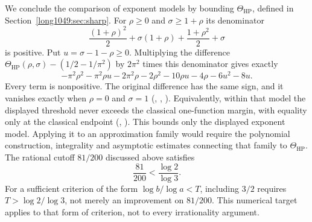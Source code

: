 We conclude the comparison of exponent models by bounding
$\Theta_{\mathrm{HP}}$, defined in Section~\ref{long1049:sec:sharp}.
For $\rho\ge0$ and $\sigma\ge1+\rho$ its denominator
\[
 \frac{(1+\rho)^2}{2}+\sigma(1+\rho)+\frac{1+\rho^2}{2}+\sigma
\]
is positive. Put $u=\sigma-1-\rho\ge0$. Multiplying the difference
$\Theta_{\mathrm{HP}}(\rho,\sigma)-(1/2-1/\pi^2)$ by
$2\pi^2$ times this denominator gives exactly
\[
 -\pi^2\rho^2-\pi^2\rho u-2\pi^2\rho-2\rho^2-10\rho u
 -4\rho-6u^2-8u.
\]
Every term is nonpositive. The original difference has the same sign, and
it vanishes exactly when $\rho=0$ and $\sigma=1$
(,
,
).
Equivalently, within that model the displayed threshold never exceeds the
classical one-function margin, with equality only at the classical endpoint
(,
).
This bounds only the displayed exponent model. Applying it to an
approximation family would require the polynomial construction,
integrality and asymptotic estimates connecting that family to
$\Theta_{\mathrm{HP}}$.
The rational cutoff $81/200$ discussed above satisfies
\[
 \frac{81}{200}<\frac{\log2}{\log3}.
\]
For a sufficient criterion of the form $\log b/\log a<T$, including
$3/2$ requires $T>\log2/\log3$, not merely an improvement on
$81/200$. This numerical target applies to that form of criterion,
not to every irrationality argument.

